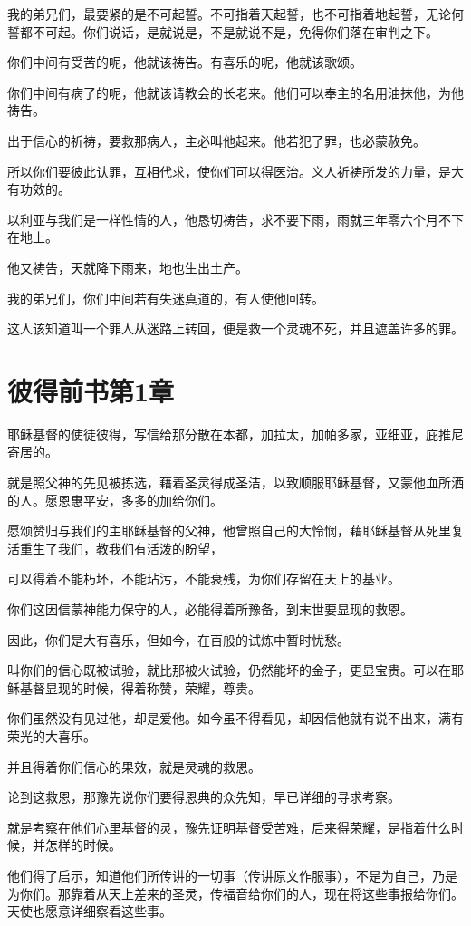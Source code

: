 \documentclass[12pt,oneside]{book}
\begin{document}
我的弟兄们，最要紧的是不可起誓。不可指着天起誓，也不可指着地起誓，无论何誓都不可起。你们说话，是就说是，不是就说不是，免得你们落在审判之下。

你们中间有受苦的呢，他就该祷告。有喜乐的呢，他就该歌颂。

你们中间有病了的呢，他就该请教会的长老来。他们可以奉主的名用油抹他，为他祷告。

出于信心的祈祷，要救那病人，主必叫他起来。他若犯了罪，也必蒙赦免。

所以你们要彼此认罪，互相代求，使你们可以得医治。义人祈祷所发的力量，是大有功效的。

以利亚与我们是一样性情的人，他恳切祷告，求不要下雨，雨就三年零六个月不下在地上。

他又祷告，天就降下雨来，地也生出土产。

我的弟兄们，你们中间若有失迷真道的，有人使他回转。

这人该知道叫一个罪人从迷路上转回，便是救一个灵魂不死，并且遮盖许多的罪。

\chapter{彼得前书第1章}
耶稣基督的使徒彼得，写信给那分散在本都，加拉太，加帕多家，亚细亚，庇推尼寄居的。

就是照父神的先见被拣选，藉着圣灵得成圣洁，以致顺服耶稣基督，又蒙他血所洒的人。愿恩惠平安，多多的加给你们。

愿颂赞归与我们的主耶稣基督的父神，他曾照自己的大怜悯，藉耶稣基督从死里复活重生了我们，教我们有活泼的盼望，

可以得着不能朽坏，不能玷污，不能衰残，为你们存留在天上的基业。

你们这因信蒙神能力保守的人，必能得着所豫备，到末世要显现的救恩。

因此，你们是大有喜乐，但如今，在百般的试炼中暂时忧愁。

叫你们的信心既被试验，就比那被火试验，仍然能坏的金子，更显宝贵。可以在耶稣基督显现的时候，得着称赞，荣耀，尊贵。

你们虽然没有见过他，却是爱他。如今虽不得看见，却因信他就有说不出来，满有荣光的大喜乐。

并且得着你们信心的果效，就是灵魂的救恩。

论到这救恩，那豫先说你们要得恩典的众先知，早已详细的寻求考察。

就是考察在他们心里基督的灵，豫先证明基督受苦难，后来得荣耀，是指着什么时候，并怎样的时候。

他们得了启示，知道他们所传讲的一切事（传讲原文作服事），不是为自己，乃是为你们。那靠着从天上差来的圣灵，传福音给你们的人，现在将这些事报给你们。天使也愿意详细察看这些事。
\end{document}

